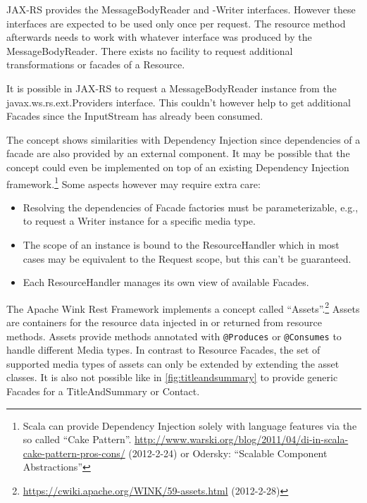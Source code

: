 \documentclass[11pt,a4paper,headsepline,twoside]{scrartcl}		%
\newcommand{\citeurl}[2]{\url{#1} (#2)}
\begin{document}
JAX-RS provides the MessageBodyReader and -Writer interfaces. However these
interfaces are expected to be used only once per request. The resource method
afterwards needs to work with whatever interface was produced by the
MessageBodyReader. There exists no facility to request additional
transformations or facades of a Resource.

It is possible in JAX-RS to request a MessageBodyReader instance from the
javax.ws.rs.ext.Providers interface. This couldn't however help to get
additional Facades since the InputStream has already been consumed.

The concept shows similarities with Dependency Injection since dependencies of a
facade are also provided by an external component. It may be possible that the
concept could even be implemented on top of an existing Dependency Injection
framework.\footnote{Scala can provide Dependency Injection solely with language
  features via the so called ``Cake
  Pattern''. \citeurl{http://www.warski.org/blog/2011/04/di-in-scala-cake-pattern-pros-cons/}{2012-2-24}
  or Odersky: ``Scalable Component Abstractions''} Some aspects however may
require extra care:

\begin{itemize}
\item Resolving the dependencies of Facade factories must be parameterizable,
  e.g., to request a Writer instance for a specific media type.
\item The scope of an instance is bound to the ResourceHandler which in most
  cases may be equivalent to the Request scope, but this can't be guaranteed.
\item Each ResourceHandler manages its own view of available Facades.
\end{itemize}

The Apache Wink Rest Framework implements a concept called
``Assets''.\footnote{\citeurl{https://cwiki.apache.org/WINK/59-assets.html}{2012-2-28}}
Assets are containers for the resource data injected in or returned from
resource methods. Assets provide methods annotated with \lstinline:@Produces: or
\lstinline:@Consumes: to handle different Media types. In contrast to Resource
Facades, the set of supported media types of assets can only be extended by
extending the asset classes. It is also not possible like in
\autoref{fig:titleandsummary} to provide generic Facades for a TitleAndSummary
or Contact.
\end{document}
